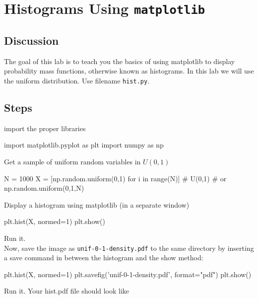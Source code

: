 \chapter{Histograms Using {\tt matplotlib}}

\setcounter{problem}{1}
\section{Discussion}

\begin{fullwidth}

The goal of this lab is to teach you the basics of using matplotlib to display probability mass functions, otherwise known as histograms. In this lab we will use the uniform distribution. Use filename {\tt hist.py}.

\section{Steps}

\step import the proper libraries

\begin{pyverbatim}
import matplotlib.pyplot as plt
import numpy as np
\end{pyverbatim}

\step Get a sample of uniform random variables in $U(0,1)$

\begin{pyverbatim}
N = 1000
X = [np.random.uniform(0,1) for i in range(N)] # U(0,1)
# or np.random.uniform(0,1,N)
\end{pyverbatim}

\step Display a histogram using matplotlib (in a separate window)

\begin{pyverbatim}
plt.hist(X, normed=1)
plt.show()
\end{pyverbatim}

\step Run it. \\

\step Now, save the image as {\tt unif-0-1-density.pdf} to the same directory by inserting a save command in between the histogram and the show method:

\begin{pyverbatim}
plt.hist(X, normed=1)
plt.savefig('unif-0-1-density.pdf', format="pdf")
plt.show()
\end{pyverbatim}

\step Run it. Your hist.pdf file should look like


\end{fullwidth}
